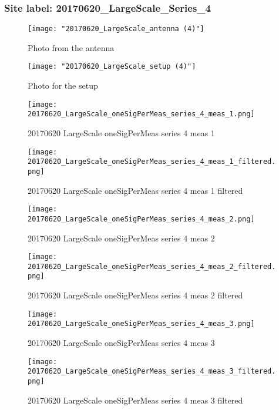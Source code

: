 \subsubsection{Site label: 20170620\_LargeScale\_Series\_4}
\begin{figure}[ht] \caption{Photo from the antenna}
\texttt{[image: "20170620\_LargeScale\_antenna (4)"]}\centering\end{figure}
\begin{figure}[ht] \caption{Photo for the setup}
\texttt{[image: "20170620\_LargeScale\_setup (4)"]}\centering\end{figure}
\begin{figure}[ht] \caption{20170620 LargeScale oneSigPerMeas series 4 meas 1}
\texttt{[image: 20170620\_LargeScale\_oneSigPerMeas\_series\_4\_meas\_1.png]}\centering\end{figure}
\begin{figure}[ht] \caption{20170620 LargeScale oneSigPerMeas series 4 meas 1 filtered}
\texttt{[image: 20170620\_LargeScale\_oneSigPerMeas\_series\_4\_meas\_1\_filtered.png]}\centering\end{figure}
\begin{figure}[ht] \caption{20170620 LargeScale oneSigPerMeas series 4 meas 2}
\texttt{[image: 20170620\_LargeScale\_oneSigPerMeas\_series\_4\_meas\_2.png]}\centering\end{figure}
\begin{figure}[ht] \caption{20170620 LargeScale oneSigPerMeas series 4 meas 2 filtered}
\texttt{[image: 20170620\_LargeScale\_oneSigPerMeas\_series\_4\_meas\_2\_filtered.png]}\centering\end{figure}
\begin{figure}[ht] \caption{20170620 LargeScale oneSigPerMeas series 4 meas 3}
\texttt{[image: 20170620\_LargeScale\_oneSigPerMeas\_series\_4\_meas\_3.png]}\centering\end{figure}
\begin{figure}[ht] \caption{20170620 LargeScale oneSigPerMeas series 4 meas 3 filtered}
\texttt{[image: 20170620\_LargeScale\_oneSigPerMeas\_series\_4\_meas\_3\_filtered.png]}\centering\end{figure}
\clearpage

